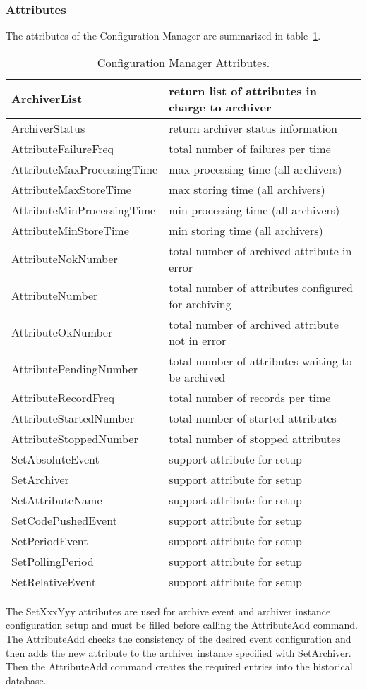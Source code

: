 \documentclass[11pt,a4paper]{article}
\def \cm{Configuration Manager}
\begin{document}
\subsubsection{Attributes}
\label{cm:attributes}
The attributes of the \cm{} are summarized in table~\ref{cm:attributes-table}.
\begin{table}[H]
	\begin{tabular}{p{}|p{}}
		\hline
		ArchiverList & return list of attributes in charge to archiver \\
		\hline
		ArchiverStatus & return archiver status information \\
		\hline
		AttributeFailureFreq & total number of failures per time \\
		\hline
		AttributeMaxProcessingTime & max processing time (all archivers) \\
		\hline
		AttributeMaxStoreTime & max storing time (all archivers) \\
		\hline
		AttributeMinProcessingTime & min processing time (all archivers) \\
		\hline
		AttributeMinStoreTime & min storing time (all archivers) \\
		\hline
		AttributeNokNumber & total number of archived attribute in error \\
		\hline
		AttributeNumber & total number of attributes configured for archiving \\
		\hline
		AttributeOkNumber & total number of archived attribute not in error \\
		\hline
		AttributePendingNumber & total number of attributes waiting to be archived \\
		\hline
		AttributeRecordFreq & total number of records per time \\
		\hline
		AttributeStartedNumber & total number of started attributes \\
		\hline
		AttributeStoppedNumber & total number of stopped attributes \\
		\hline
		SetAbsoluteEvent & support attribute for setup \\
		\hline
		SetArchiver & support attribute for setup \\
		\hline
		SetAttributeName & support attribute for setup \\
		\hline
		SetCodePushedEvent & support attribute for setup \\
		\hline
		SetPeriodEvent & support attribute for setup \\
		\hline
		SetPollingPeriod & support attribute for setup \\
		\hline
		SetRelativeEvent & support attribute for setup \\
		\hline
	\end{tabular}
	\caption{\cm{} Attributes.}
	\label{cm:attributes-table}
\end{table}
The SetXxxYyy attributes are used for archive event and
archiver instance configuration setup and must be filled before calling
the AttributeAdd command.
The AttributeAdd checks the consistency of the desired event
configuration and then adds the new attribute to the archiver
instance specified with SetArchiver.
Then the AttributeAdd command creates the required entries into the
historical database.
\end{document}
